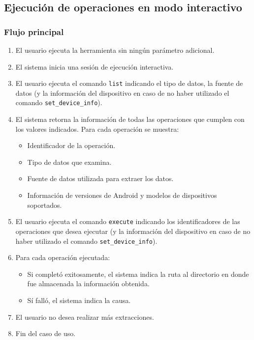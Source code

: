 \subsection{Ejecución de operaciones en modo interactivo}

\subsubsection*{Flujo principal}
\begin{enumerate}
\item El usuario ejecuta la herramienta sin ningún parámetro adicional.
\item El sistema inicia una sesión de ejecución interactiva.
\item El usuario ejecuta el comando \texttt{list} indicando el tipo de datos, la fuente de datos (y la información del dispositivo en caso de no haber utilizado el comando \texttt{set\_device\_info}).
\item El sistema retorna la información de todas las operaciones que cumplen con los valores indicados. Para cada operación se muestra:
    \begin{itemize}
    \item Identificador de la operación.
    \item Tipo de datos que examina.
    \item Fuente de datos utilizada para extraer los datos.
    \item Información de versiones de Android y modelos de dispositivos soportados.
    \end{itemize}
\item El usuario ejecuta el comando \texttt{execute} indicando los identificadores de las operaciones que desea ejecutar (y la información del dispositivo en caso de no haber utilizado el comando \texttt{set\_device\_info}).
\item Para cada operación ejecutada:
    \begin{itemize}
    \item Si completó exitosamente, el sistema indica la ruta al directorio en donde fue almacenada la información obtenida.
    \item Sí falló, el sistema indica la causa.
    \end{itemize}
\item El usuario no desea realizar más extracciones.
\item Fin del caso de uso.
\end{enumerate}

